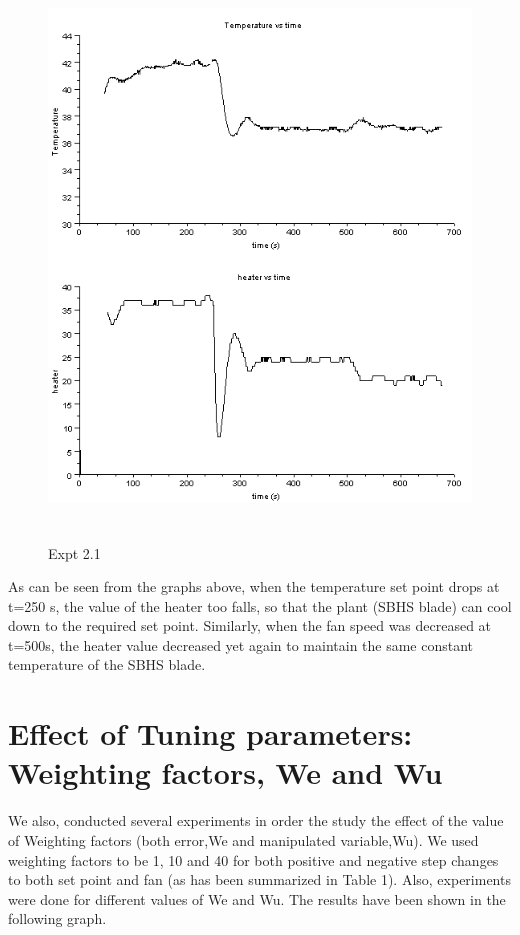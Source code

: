 \begin{figure}[H]
  \includegraphics[width=12cm, height=15cm]{mpc/2_1_heater_final.png}
  \caption{Expt 2.1}
\end{figure}
As can be seen from the graphs above, when the temperature set point drops at t=250 s, the value of the heater too falls, so that the plant (SBHS blade) can cool down to the required set point. Similarly, when the fan speed was decreased at t=500s, the heater value decreased yet again to maintain the same constant temperature of the SBHS blade.


\section{Effect of Tuning parameters: Weighting factors, We and Wu}
We also, conducted several experiments in order the study the effect of the value of Weighting factors (both error,We and manipulated variable,Wu). We used weighting factors to be 1, 10 and 40 for both positive and negative step changes to both set point and fan (as has been summarized in Table 1). Also, experiments were done for different values of We and Wu. The results have been shown in the following graph. \\
